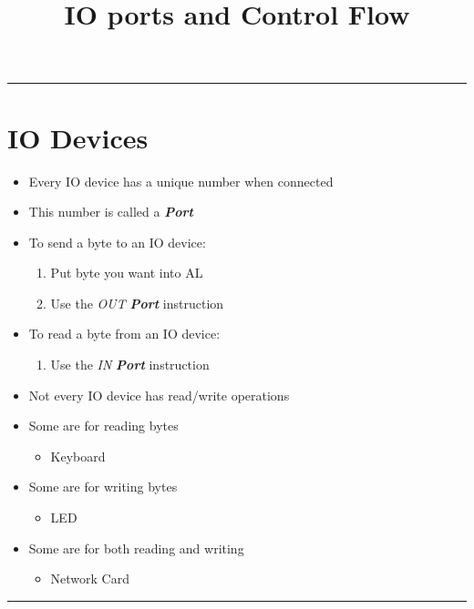 \documentclass{article}
\title{IO ports and Control Flow}
\begin{document}
\maketitle

\begin{center}
  \rule{.5\textwidth}{0.4pt}
\end{center}

\section{IO Devices}
\begin{itemize}
  \item{Every IO device has a unique number when connected}
  \item{This number is called a \textbf{\textit{Port}}}
  \item{To send a byte to an IO device:}
  \begin{enumerate}
    \item{Put byte you want into AL}
    \item{Use the \textit{OUT} \textbf{\textit{Port}} instruction}
  \end{enumerate}
  \item{To read a byte from an IO device:}
  \begin{enumerate}
    \item{Use the \textit{IN} \textbf{\textit{Port}} instruction}
  \end{enumerate}
  \item{Not every IO device has read/write operations}
  \item{Some are for reading bytes}
  \begin{itemize}
    \item{Keyboard}
  \end{itemize}
  \item{Some are for writing bytes}
  \begin{itemize}
    \item{LED}
  \end{itemize}
  \item{Some are for both reading and writing}
  \begin{itemize}
     \item{Network Card}
  \end{itemize}
\end{itemize}

\begin{center}
  \rule{.5\textwidth}{0.4pt}
\end{center}
\end{document}
